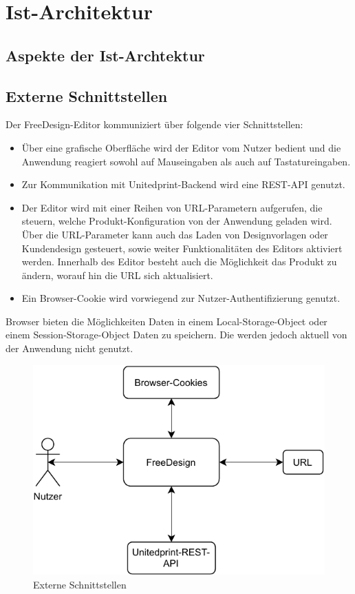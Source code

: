 \section{Ist-Architektur}

\subsection{Aspekte der Ist-Archtektur}


\subsection{Externe Schnittstellen}
Der FreeDesign-Editor kommuniziert über folgende vier Schnittstellen:
\begin{itemize}
	\item Über eine grafische Oberfläche wird der Editor vom Nutzer bedient und die Anwendung reagiert sowohl auf Mauseingaben als auch auf Tastatureingaben. 
	\item Zur Kommunikation mit Unitedprint-Backend wird eine REST-API genutzt. 
	\item Der Editor wird mit einer Reihen von URL-Parametern aufgerufen, die steuern, welche Produkt-Konfiguration von der Anwendung geladen wird. Über die URL-Parameter kann auch das Laden von Designvorlagen oder Kundendesign gesteuert, sowie weiter Funktionalitäten des Editors aktiviert werden. 
	Innerhalb des Editor besteht auch die Möglichkeit das Produkt zu ändern, worauf hin die URL sich aktualisiert.
	\item Ein Browser-Cookie wird vorwiegend zur Nutzer-Authentifizierung genutzt. 
\end{itemize}

Browser bieten die Möglichkeiten Daten in einem Local-Storage-Object oder einem Session-Storage-Object Daten zu speichern. \autocite[vgl.][]{Mozilla:Storage}
Die werden jedoch aktuell von der Anwendung nicht genutzt. 


\begin{figure}[H]
  \centering
  \includegraphics{diagrams/Ist-Architektur/Freedesign_Interaktion.pdf}
   \caption{Externe Schnittstellen}
   \label{fig:Externe_Schnittstellen}
\end{figure}



